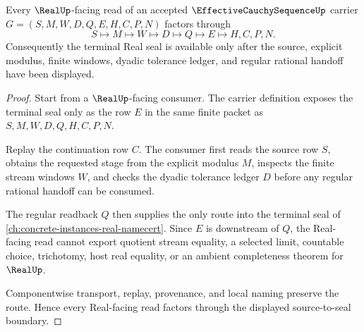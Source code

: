 \begin{theorem}\label{thm:effective-cauchy-sequence-real-seal-boundary}
Every $\RealUp$-facing read of an accepted $\EffectiveCauchySequenceUp$ carrier $G=(S,M,W,D,Q,E,H,C,P,N)$ factors through
$$
S \longmapsto M \longmapsto W \longmapsto D \longmapsto Q \longmapsto E \longmapsto H,C,P,N .
$$
Consequently the terminal Real seal is available only after the source, explicit modulus, finite windows, dyadic tolerance ledger, and regular rational handoff have been displayed.
\end{theorem}
\begin{proof}
Start from a $\RealUp$-facing consumer. The carrier definition exposes the terminal seal only as the row $E$ in the same finite packet as $S,M,W,D,Q,H,C,P,N$.

Replay the continuation row $C$. The consumer first reads the source row $S$, obtains the requested stage from the explicit modulus $M$, inspects the finite stream windows $W$, and checks the dyadic tolerance ledger $D$ before any regular rational handoff can be consumed.

The regular readback $Q$ then supplies the only route into the terminal seal of \autoref{ch:concrete-instances-real-namecert}. Since $E$ is downstream of $Q$, the Real-facing read cannot export quotient stream equality, a selected limit, countable choice, trichotomy, host real equality, or an ambient completeness theorem for $\RealUp$.

Componentwise transport, replay, provenance, and local naming preserve the route. Hence every Real-facing read factors through the displayed source-to-seal boundary.
\end{proof}

